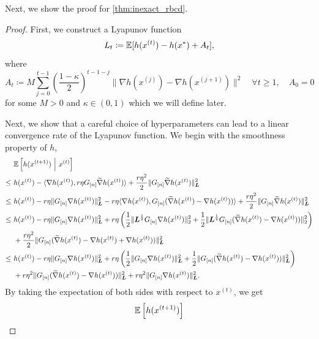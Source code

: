 Next, we show the proof for \autoref{thm:inexact_rbcd}.

\begin{proof}
    First, we construct a Lyapunov function 
    \[L_t \coloneqq \mathbb{E}[ h(x^{(t)}) - h(x^*) + A_t],\]
    where 
    \[A_t \coloneqq  M \sum_{j=0}^{t-1} \left(\frac{1-\kappa}{2}\right)^{t-1-j} \| \nabla h(x^{(j)}) - {\nabla} h(x^{(j+1)}) \|^2 \quad \forall t \geq 1, \quad A_0 = 0\]
    for some $M > 0$ and $\kappa \in (0,1)$ which we will define later. 
    
    Next, we show that a careful choice of hyperparameters can lead to a linear convergence rate of the Lyapunov function. We begin with the smoothness property of $h$,
    \begin{align}
        &\mE \left[ h( x^{(t+1)} ) ~\Big|~ x^{(t)} \right] \nonumber \\
        \leq~& h( x^{(t)} ) - \langle \nabla h(x^{(t)}), r \eta G_{[n]} \wt{\nabla} h(x^{(t)}) \rangle + \frac{r \eta^2}{2} \|  G_{[n]} \wt{\nabla} h(x^{(t)}) \|_{\bL}^2 \nonumber \\
        \leq~& h(x^{(t)}) - r \eta \| G_{[n]} \nabla h(x^{(t)}) \|_{\bL}^2  -  \vphantom{\frac{r \eta^2 L_{\max}}{2}} r \eta \langle \nabla h(x^{(t)}), G_{[n]} ( \wt{\nabla} h(x^{(t)}) - \nabla h(x^{(t)}) ) \rangle + \frac{r \eta^2 }{2} \| G_{[n]} \wt{\nabla} h(x^{(t)})\|_{\bL}^2 \nonumber \\
        \leq~& h(x^{(t)}) - r \eta \| G_{[n]} \nabla h(x^{(t)}) \|_{\bL}^2 + r \eta \left( \frac{1}{2} \| \bL^{\frac{1}{2}} G_{[n]} \nabla h(x^{(t)}) \|_{2}^2 + \frac{1}{2} \| \bL^{\frac{1}{2}} G_{[n]} ( \wt{\nabla} h(x^{(t)}) - \nabla h(x^{(t)}) )  \|_2^2 \right) \nonumber \\
        &+ \frac{r \eta^2 }{2} \| G_{[n]} ( \wt{\nabla} h(x^{(t)}) - \nabla h(x^{(t)}) + \nabla h(x^{(t)}) ) \|_{\bL}^2 \nonumber \\
        \leq~& h(x^{(t)}) - r \eta \| G_{[n]} \nabla h(x^{(t)}) \|_{\bL}^2 + r \eta \left( \frac{1}{2} \| G_{[n]} \nabla h(x^{(t)}) \|_{\bL}^2 + \frac{1}{2} \| G_{[n]} ( \wt{\nabla} h(x^{(t)}) - \nabla h(x^{(t)}) )  \|_{\bL}^2 \right) \nonumber \\
        &+ r \eta^2 \| G_{[n]} ( \wt{\nabla} h(x^{(t)}) - \nabla h(x^{(t)} ) ) \|_{\bL}^2 + r \eta^2 \| G_{[n]} \nabla h(x^{(t)}) \|_{\bL}^2.
        \label{eq:decompose}
    \end{align}
    By taking the expectation of both sides with respect to $x^{(t)}$, we get
    \begin{align}
        \mE\left[ h(x^{(t+1)}) \right]

\end{align}
\end{proof}
